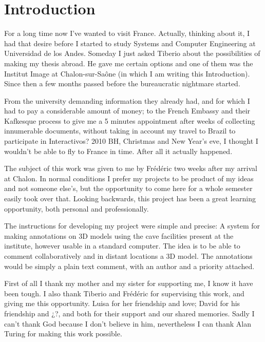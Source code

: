 %
\section{Introduction}
For a long time now I've wanted to visit France. Actually, thinking about it, I had that desire before I started to study Systems and Computer Engineering at Universidad de los Andes. Someday I just asked Tiberio about the possibilities of making my thesis abroad. He gave me certain options and one of them was the Institut Image at Chalon-sur-Saône (in which I am writing this Introduction). Since then a few months passed before the bureaucratic nightmare started. 

From the university demanding information they already had, and for which I had to pay a considerable amount of money; to the French Embassy and their Kafkesque process to give me a 5 minutes appointment after weeks of collecting innumerable documents, without taking in account my travel to Brazil to participate in Interactivos? 2010 BH, Christmas and New Year's eve, I thought I wouldn't be able to fly to France in time.  After all it actually happened.

The subject of this work was given to me by Frédéric two weeks after my arrival at Chalon. In normal conditions I prefer my projects to be product of my ideas and not someone else's, but the opportunity to come here for a whole semester easily took over that. Looking backwards, this project has been a great learning opportunity, both personal and professionally.


The instructions for developing my project were simple and precise: A system for making annotations on 3D models using the cave facilities present at the institute, however usable in a standard computer. The idea is to be able to comment collaboratively and in distant locations a 3D model. The annotations would be simply a plain text comment, with an author and a priority attached. 




First of all I thank my mother and my sister for supporting me, I know it have been tough. I also thank Tiberio and Frédéric for supervising this work, and giving me this opportunity. Luisa for her friendship and love; David for his friendship and ¿?, and both for their support and our shared memories. Sadly I can't thank God because I don't believe in him, nevertheless I can thank Alan Turing for making this work possible.